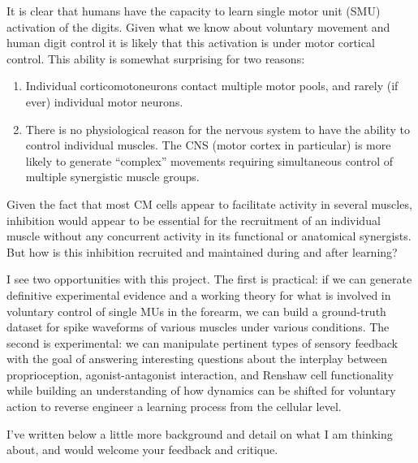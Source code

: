 {            It is clear that humans have the capacity to learn single
            motor unit (SMU) activation of the digits. Given what we
            know about voluntary movement and human digit control it is
            likely that this activation is under motor cortical control.
            This ability is somewhat surprising for two reasons:

            \begin{enumerate}
            \def\labelenumi{\arabic{enumi}.}
            \tightlist
            \item
              Individual corticomotoneurons contact multiple motor
              pools, and rarely (if ever) individual motor neurons.
            \item
              There is no physiological reason for the nervous system to
              have the ability to control individual muscles. The CNS
              (motor cortex in particular) is more likely to generate
              ``complex'' movements requiring simultaneous control of
              multiple synergistic muscle groups.
            \end{enumerate}

            Given the fact that most CM cells appear to facilitate
            activity in several muscles, inhibition would appear to be
            essential for the recruitment of an individual muscle
            without any concurrent activity in its functional or
            anatomical synergists. But how is this inhibition recruited
            and maintained during and after learning?

            I see two opportunities with this project. The first is
            practical: if we can generate definitive experimental
            evidence and a working theory for what is involved in
            voluntary control of single MUs in the forearm, we can build
            a ground-truth dataset for spike waveforms of various
            muscles under various conditions. The second is
            experimental: we can manipulate pertinent types of sensory
            feedback with the goal of answering interesting questions
            about the interplay between proprioception,
            agonist-antagonist interaction, and Renshaw cell
            functionality while building an understanding of how
            dynamics can be shifted for voluntary action to reverse
            engineer a learning process from the cellular level.

            I've written below a little more background and detail on
            what I am thinking about, and would welcome your feedback
            and critique.

}
